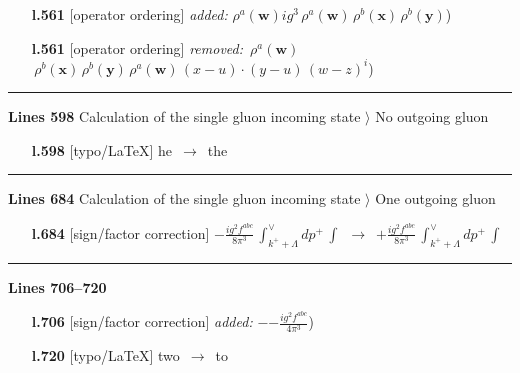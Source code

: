 \documentclass[10pt]{article}
\begin{document}
\begin{itemize}[leftmargin=2.2em,itemsep=1pt,topsep=2pt]
\item[\textbf{l.561}] \textsf{\small [operator ordering]} \emph{added:} $\displaystyle \rho^{a}(\mathbf{w})$$\displaystyle ig^{3}\,\rho^{a}(\mathbf{w})\,\rho^{b}(\mathbf{x})\,\rho^{b}(\mathbf{y})${\color{gray}\small)}
\item[\textbf{l.561}] \textsf{\small [operator ordering]} \emph{removed:} $\displaystyle \,\rho^{a}(\mathbf{w})$$\displaystyle \,\rho^{b}(\mathbf{x})\,\rho^{b}(\mathbf{y})\,\rho^{a}(\mathbf{w})\, (x-u)\cdot (y-u)\,(w-z)^{i}${\color{gray}\small)}
\end{itemize}
\noindent\rule{\linewidth}{0.3pt}\par\noindent\textbf{Lines 598} \quad \textsf{Calculation of the single gluon incoming state $\rangle$ No outgoing gluon}\par
\begin{itemize}[leftmargin=2.2em,itemsep=1pt,topsep=2pt]
\item[\textbf{l.598}] \textsf{\small [typo/LaTeX]} he\ $\longrightarrow$\ the
\end{itemize}
\noindent\rule{\linewidth}{0.3pt}\par\noindent\textbf{Lines 684} \quad \textsf{Calculation of the single gluon incoming state $\rangle$ One outgoing gluon} \par
\begin{itemize}[leftmargin=2.2em,itemsep=1pt,topsep=2pt]
\item[\textbf{l.684}] \textsf{\small [sign/factor correction]} $\displaystyle -\frac{ig^{2}f^{abc}}{8\pi^{3}}\,\int_{k^{+}+\Lambda}^{\vee} dp^{+}\,\int$\ $\longrightarrow$\ $\displaystyle +\frac{ig^{2}f^{abc}}{8\pi^{3}}\,\int_{k^{+}+\Lambda}^{\vee} dp^{+}\,\int$
\end{itemize}
\noindent\rule{\linewidth}{0.3pt}\par\noindent\textbf{Lines 706--720} \par
\begin{itemize}[leftmargin=2.2em,itemsep=1pt,topsep=2pt]
\item[\textbf{l.706}] \textsf{\small [sign/factor correction]} \emph{added:} $\displaystyle -$$\displaystyle -\frac{ig^2 f^{abc}} {4 \pi^3}${\color{gray}\small)}
\item[\textbf{l.720}] \textsf{\small [typo/LaTeX]} two\ $\longrightarrow$\ to
\end{itemize}
\end{document}
